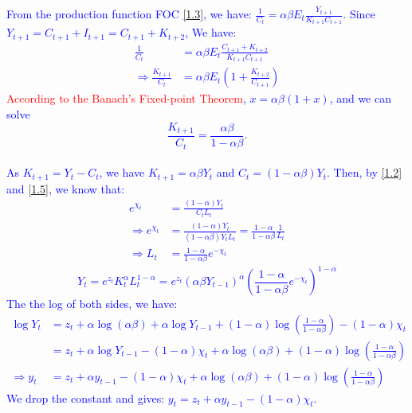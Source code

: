 \begin{solution}
    \textcolor{blue}{
        From the production function FOC \ref{1.3}, we have:
        $\frac{1}{C_t} = \alpha \beta E_t \frac{Y_{t+1} }{K_{t+1}C_{t+1}}.$
        Since $Y_{t+1} = C_{t+1} + I_{t+1} = C_{t+1} + K_{t+2}$, We have: 
        \begin{align*}
            \frac{1}{C_t} &= \alpha \beta E_t \frac{C_{t+1} + K_{t+2}}{K_{t+1}C_{t+1}} \\
            \Rightarrow \frac{K_{t+1} }{C_t} &= \alpha \beta E_t \left(1 + \frac{K_{t+2} }{C_{t+1} }\right)
        \end{align*} 
        \textcolor{red}{According to the Banach's Fixed-point Theorem}, $x = \alpha \beta (1+x)$, and we can solve \[\frac{K_{t+1}}{C_t} = \frac{\alpha \beta }{1-\alpha \beta}.\]\\
        As $K_{t+1} = Y_t - C_t$, we have $K_{t+1} = \alpha \beta Y_t $ and $C_t = (1-\alpha \beta )Y_t$.
        Then, by \ref{1.2} and \ref{1.5}, we know that:
        \begin{align*}
            e^{\chi _t} &= \frac{(1-\alpha )Y_t}{C_t L_t} \\
            \Rightarrow e^{\chi _t} &= \frac{(1-\alpha )Y_t}{(1-\alpha \beta )Y_t L_t} = \frac{1-\alpha }{1-\alpha \beta } \frac{1}{L_t} \\
            \Rightarrow L_t &= \frac{1-\alpha }{1-\alpha \beta }e^{-\chi _t}
        \end{align*} 
        \[Y_t = e^{z_t}K_t^\alpha L_t^{1-\alpha} = e^{z_t}(\alpha \beta Y_{t-1} )^\alpha \left(\frac{1-\alpha }{1-\alpha \beta }e^{-\chi _t}\right)^{1-\alpha}\]
        The the log of both sides, we have:
        \begin{align*}
            \log Y_t &= z_t + \alpha \log (\alpha \beta ) + \alpha \log Y_{t-1} + (1-\alpha )\log \left(\frac{1-\alpha }{1-\alpha \beta }\right) - (1-\alpha )\chi _t \\
            &= z_t + \alpha \log Y_{t-1} - (1-\alpha )\chi _t + \alpha \log (\alpha \beta ) + (1-\alpha )\log \left(\frac{1-\alpha }{1-\alpha \beta }\right)\\
            \Rightarrow y_t &= z_t + \alpha y_{t-1} - (1-\alpha )\chi _t + \alpha \log (\alpha \beta ) + (1-\alpha )\log \left(\frac{1-\alpha }{1-\alpha \beta }\right)
        \end{align*}
        We drop the constant and gives: $y_t = z_t + \alpha y_{t-1} - (1-\alpha )\chi _t.$
    }
\end{solution}


